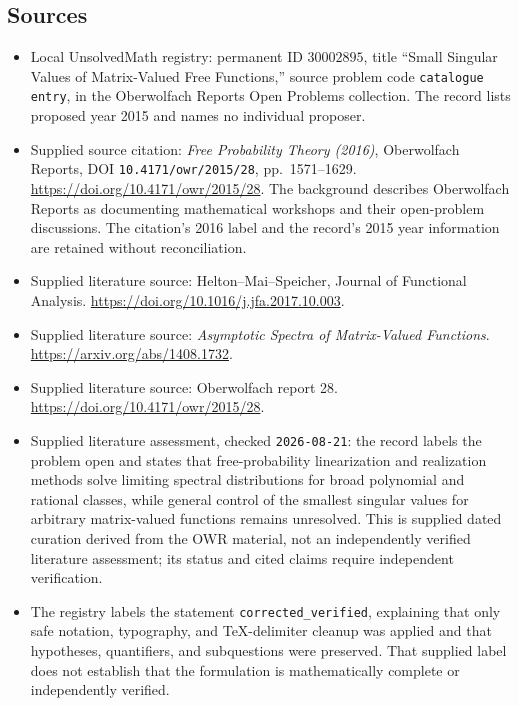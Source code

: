 \documentclass[11pt]{article}
\begin{document}
\subsection{Sources}
\begin{itemize}
\item Local UnsolvedMath registry: permanent ID \(30002895\), title ``Small Singular Values of Matrix-Valued Free Functions,'' source problem code \texttt{catalogue entry}, in the Oberwolfach Reports Open Problems collection. The record lists proposed year 2015 and names no individual proposer.
\item Supplied source citation: \emph{Free Probability Theory (2016)}, Oberwolfach Reports, DOI \texttt{10.4171/owr/2015/28}, pp.~1571--1629. \url{https://doi.org/10.4171/owr/2015/28}. The background describes Oberwolfach Reports as documenting mathematical workshops and their open-problem discussions. The citation's 2016 label and the record's 2015 year information are retained without reconciliation.
\item Supplied literature source: Helton--Mai--Speicher, Journal of Functional Analysis. \url{https://doi.org/10.1016/j.jfa.2017.10.003}.
\item Supplied literature source: \emph{Asymptotic Spectra of Matrix-Valued Functions}. \url{https://arxiv.org/abs/1408.1732}.
\item Supplied literature source: Oberwolfach report 28. \url{https://doi.org/10.4171/owr/2015/28}.
\item Supplied literature assessment, checked \texttt{2026-08-21}: the record labels the problem open and states that free-probability linearization and realization methods solve limiting spectral distributions for broad polynomial and rational classes, while general control of the smallest singular values for arbitrary matrix-valued functions remains unresolved. This is supplied dated curation derived from the OWR material, not an independently verified literature assessment; its status and cited claims require independent verification.
\item The registry labels the statement \texttt{corrected\_verified}, explaining that only safe notation, typography, and TeX-delimiter cleanup was applied and that hypotheses, quantifiers, and subquestions were preserved. That supplied label does not establish that the formulation is mathematically complete or independently verified.
\end{itemize}
\end{document}
